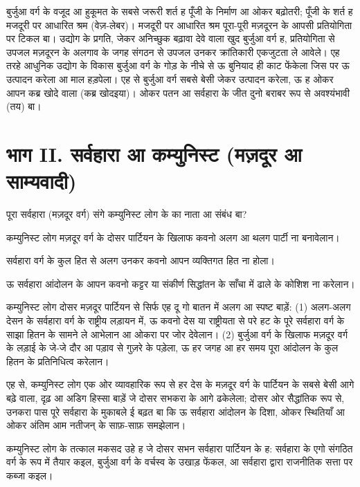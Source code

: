 \documentclass[12pt,a4paper,oneside]{book}
\begin{document}
बुर्जुआ वर्ग के वजूद आ हुकूमत के सबसे जरूरी शर्त ह पूँजी के निर्माण आ ओकर बढ़ोतरी; पूँजी के शर्त ह मजदूरी पर आधारित श्रम (वेज़-लेबर)। मजदूरी पर आधारित श्रम पूरा-पूरी मज़दूरन के आपसी प्रतियोगिता पर टिकल बा। उद्योग के प्रगति, जेकर अनिच्छुक बढ़ावा देवे वाला खुद बुर्जुआ वर्ग ह, प्रतियोगिता से उपजल मज़दूरन के अलगाव के जगह संगठन से उपजल उनकर क्रांतिकारी एकजुटता ले आवेले। एह तरहे आधुनिक उद्योग के विकास बुर्जुआ वर्ग के गोड़ के नीचे से ऊ बुनियाद ही काट फेंकेला जिस पर ऊ उत्पादन करेला आ माल हड़पेला। एह से बुर्जुआ वर्ग सबसे बेसी जेकर उत्पादन करेला, ऊ ह ओकर आपन कब्र खोदे वाला (कब्र खोदइया)। ओकर पतन आ सर्वहारा के जीत दुनो बराबर रूप से अवश्यंभावी (तय) बा।

\cleardoublepage
\chapter*{भाग {\engfont II}. सर्वहारा आ कम्युनिस्ट (मज़दूर आ साम्यवादी)}
पूरा सर्वहारा (मज़दूर वर्ग) संगे कम्युनिस्ट लोग के का नाता आ संबंध बा?

कम्युनिस्ट लोग मज़दूर वर्ग के दोसर पार्टियन के खिलाफ कवनो अलग आ थलग पार्टी ना बनावेलान।

सर्वहारा वर्ग के कुल हित से अलग उनकर कवनो आपन व्यक्तिगत हित ना होला।

ऊ सर्वहारा आंदोलन के आपन कवनो कट्टर या संकीर्ण सिद्धांतन के साँचा में ढाले के कोशिश ना करेलान।

कम्युनिस्ट लोग दोसर मज़दूर पार्टियन से सिर्फ एह दू गो बातन में अलग आ स्पष्ट बाड़ें: {\engfont (1)} अलग-अलग देसन के सर्वहारा वर्ग के राष्ट्रीय लड़ायन में, ऊ कवनो देस या राष्ट्रीयता से परे हट के पूरे सर्वहारा वर्ग के साझा हितन के सामने ले आभेलान आ ओकरा पर जोर देवेलान। {\engfont (2)} बुर्जुआ वर्ग के खिलाफ मज़दूर वर्ग के लड़ाई के जे-जे दौर आ पड़ाव से गुज़रे के पड़ेला, ऊ हर जगह आ हर समय पूरा आंदोलन के कुल हितन के प्रतिनिधित्व करेलान।

एह से, कम्युनिस्ट लोग एक ओर व्यावहारिक रूप से हर देस के मज़दूर वर्ग के पार्टियन के सबसे बेसी आगे बढ़े वाला, दृढ़ आ अडिग हिस्सा बाड़ें जे दोसर सभकरा के आगे ढकेलेला; दोसर ओर सैद्धांतिक रूप से, उनकरा पास पूरे सर्वहारा के मुकाबले ई बढ़त बा कि ऊ सर्वहारा आंदोलन के दिशा, ओकर स्थितियाँ आ ओकर अंतिम आम नतीजन् के साफ़-साफ़ समझेलान।

कम्युनिस्ट लोग के तत्काल मकसद उहे ह जे दोसर सभन सर्वहारा पार्टियन के ह: सर्वहारा के एगो संगठित वर्ग के रूप में तैयार कइल, बुर्जुआ वर्ग के वर्चस्व के उखाड़ फेंकल, आ सर्वहारा द्वारा राजनीतिक सत्ता पर कब्जा कइल।
\end{document}
